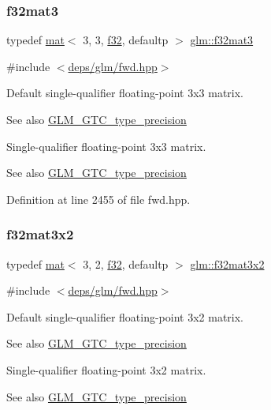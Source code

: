 \subsubsection{\texorpdfstring{f32mat3}{f32mat3}}
{\footnotesize\ttfamily typedef \hyperlink{structglm_1_1mat}{mat}$<$ 3, 3, \hyperlink{group__gtc__type__precision_ga0ec999b57f5330d9021256e96038df04}{f32}, defaultp $>$ \hyperlink{group__gtc__type__precision_gaf4cf4ab937cf94a202e7decd85cf1e6d}{glm\+::f32mat3}}



{\ttfamily \#include $<$\hyperlink{fwd_8hpp}{deps/glm/fwd.\+hpp}$>$}

Default single-\/qualifier floating-\/point 3x3 matrix. \begin{DoxySeeAlso}{See also}
\hyperlink{group__gtc__type__precision}{G\+L\+M\+\_\+\+G\+T\+C\+\_\+type\+\_\+precision}
\end{DoxySeeAlso}
Single-\/qualifier floating-\/point 3x3 matrix. \begin{DoxySeeAlso}{See also}
\hyperlink{group__gtc__type__precision}{G\+L\+M\+\_\+\+G\+T\+C\+\_\+type\+\_\+precision} 
\end{DoxySeeAlso}


Definition at line 2455 of file fwd.\+hpp.

\mbox{\label{group__gtc__type__precision_ga924b933089d954df062aa8d0735fc005}} 
\subsubsection{\texorpdfstring{f32mat3x2}{f32mat3x2}}
{\footnotesize\ttfamily typedef \hyperlink{structglm_1_1mat}{mat}$<$ 3, 2, \hyperlink{group__gtc__type__precision_ga0ec999b57f5330d9021256e96038df04}{f32}, defaultp $>$ \hyperlink{group__gtc__type__precision_ga924b933089d954df062aa8d0735fc005}{glm\+::f32mat3x2}}



{\ttfamily \#include $<$\hyperlink{fwd_8hpp}{deps/glm/fwd.\+hpp}$>$}

Default single-\/qualifier floating-\/point 3x2 matrix. \begin{DoxySeeAlso}{See also}
\hyperlink{group__gtc__type__precision}{G\+L\+M\+\_\+\+G\+T\+C\+\_\+type\+\_\+precision}
\end{DoxySeeAlso}
Single-\/qualifier floating-\/point 3x2 matrix. \begin{DoxySeeAlso}{See also}
\hyperlink{group__gtc__type__precision}{G\+L\+M\+\_\+\+G\+T\+C\+\_\+type\+\_\+precision} 
\end{DoxySeeAlso}



